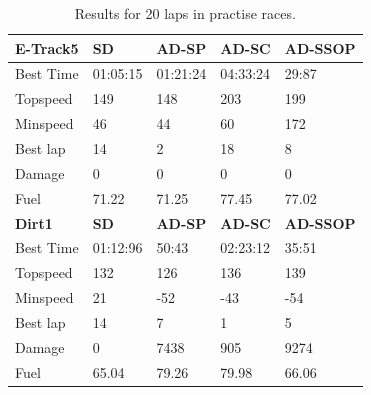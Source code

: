 \documentclass[runningheads,a4paper]{llncs}
\begin{document}
	\begin{table}[h!]
		
		\caption{Results for 20 laps in practise races.}
		{\scriptsize
			\begin{tabular}{ |p{3.5cm}|p{2cm}|p{2cm}|p{2 cm}|p{2 cm}|}
				
				\hline
				{ \color{blue}\textbf{E-Track5} }&
				{ \color{red}\textbf{SD}}&  
				{ \color{red} \textbf{AD-SP} } &
				{ \color{red} \textbf{AD-SC} } &
				{ \color{red} \textbf{AD-SSOP} }
				\\
				\hline
				Best Time & 01:05:15  & 01:21:24  &04:33:24 & 29:87 
				\\
				\hline
				Topspeed & 149  & 148 & 203 & 199 
				\\
				\hline
				Minspeed & 46 & 44 & 60 & 172 
				\\
				\hline 
				Best lap & 14 & 2 & 18 & 8 
				\\
				\hline
				Damage & 0 & 0 & 0 & 0 
				\\
				\hline 
				Fuel & 71.22 & 71.25 & 77.45 & 77.02 
				\\
				\hline
				\hline
				{ \color{blue}\textbf{Dirt1} }&
				{ \color{red}\textbf{SD}}&  
				{ \color{red} \textbf{AD-SP} } &
				{ \color{red} \textbf{AD-SC} } &
				{ \color{red} \textbf{AD-SSOP} }
				\\
				\hline
				Best Time & 01:12:96 & 50:43  &02:23:12  & 35:51 \\
				\hline
				Topspeed & 132  & 126 & 136 & 139 
				\\
				\hline
				Minspeed &  21 & -52 & -43 & -54 
				\\
				\hline 
				Best lap & 14 & 7 & 1 & 5 
				\\
				\hline
				Damage &  0 & 7438 & 905 & 9274 
				\\
				\hline 
				Fuel & 65.04 & 79.26 & 79.98 & 66.06 
				\\
				\hline

\end{tabular}}
\end{table}
\end{document}
